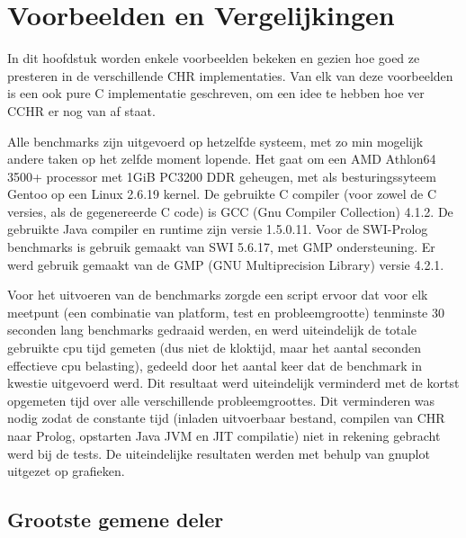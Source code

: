 \chapter{Voorbeelden en Vergelijkingen} \label{chap:bench}

\newcommand{\benchfig}[2]{
\begin{figure}[htbp]
\begin{center}
\includevector{1}{fig/bench-#1}
\caption{\label{fig:bench-#1}#2}
\end{center}
\end{figure}
}

In dit hoofdstuk worden enkele voorbeelden bekeken en gezien hoe goed ze presteren in de verschillende CHR implementaties. Van elk van deze voorbeelden is een ook pure C implementatie geschreven, om een idee te hebben hoe ver CCHR er nog van af staat.

Alle benchmarks zijn uitgevoerd op hetzelfde systeem, met zo min mogelijk andere taken op het zelfde moment lopende. Het gaat om een AMD Athlon64 3500+ processor met 1GiB PC3200 DDR geheugen, met als besturingssyteem Gentoo op een Linux 2.6.19 kernel. De gebruikte C compiler (voor zowel de C versies, als de gegenereerde C code) is GCC (Gnu Compiler Collection) 4.1.2. De gebruikte Java compiler en runtime zijn versie 1.5.0.11. Voor de SWI-Prolog benchmarks is gebruik gemaakt van SWI 5.6.17, met GMP ondersteuning. Er werd gebruik gemaakt van de GMP (GNU Multiprecision Library) versie 4.2.1.

Voor het uitvoeren van de benchmarks zorgde een script ervoor dat voor elk meetpunt (een combinatie van platform, test en probleemgrootte) tenminste 30 seconden lang benchmarks gedraaid werden, en werd uiteindelijk de totale gebruikte cpu tijd gemeten (dus niet de kloktijd, maar het aantal seconden effectieve cpu belasting), gedeeld door het aantal keer dat de benchmark in kwestie uitgevoerd werd. Dit resultaat werd uiteindelijk verminderd met de kortst opgemeten tijd over alle verschillende probleemgroottes. Dit verminderen was nodig zodat de constante tijd (inladen uitvoerbaar bestand, compilen van CHR naar Prolog, opstarten Java JVM en JIT compilatie) niet in rekening gebracht werd bij de tests. De uiteindelijke resultaten werden met behulp van gnuplot uitgezet op grafieken.

\section{Grootste gemene deler} \label{sec:bench-gcd}

